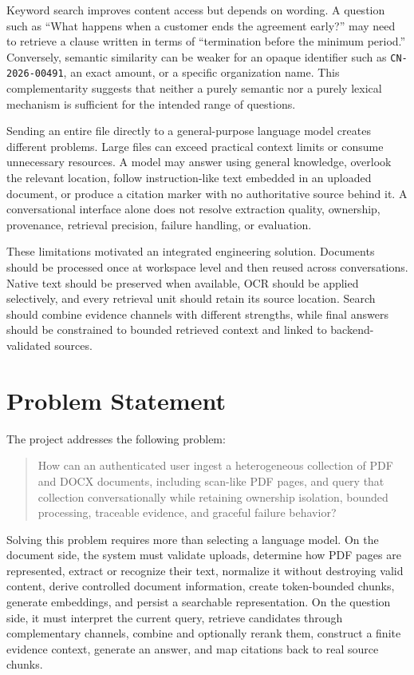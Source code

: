 Keyword search improves content access but depends on wording. A question such as ``What happens when a customer ends the agreement early?'' may need to retrieve a clause written in terms of ``termination before the minimum period.'' Conversely, semantic similarity can be weaker for an opaque identifier such as \texttt{CN-2026-00491}, an exact amount, or a specific organization name. This complementarity suggests that neither a purely semantic nor a purely lexical mechanism is sufficient for the intended range of questions.

Sending an entire file directly to a general-purpose language model creates different problems. Large files can exceed practical context limits or consume unnecessary resources. A model may answer using general knowledge, overlook the relevant location, follow instruction-like text embedded in an uploaded document, or produce a citation marker with no authoritative source behind it. A conversational interface alone does not resolve extraction quality, ownership, provenance, retrieval precision, failure handling, or evaluation.

These limitations motivated an integrated engineering solution. Documents should be processed once at workspace level and then reused across conversations. Native text should be preserved when available, OCR should be applied selectively, and every retrieval unit should retain its source location. Search should combine evidence channels with different strengths, while final answers should be constrained to bounded retrieved context and linked to backend-validated sources.

\section{Problem Statement}
\label{sec:introduction-problem}

The project addresses the following problem:

\begin{quote}
How can an authenticated user ingest a heterogeneous collection of PDF and DOCX documents, including scan-like PDF pages, and query that collection conversationally while retaining ownership isolation, bounded processing, traceable evidence, and graceful failure behavior?
\end{quote}

Solving this problem requires more than selecting a language model. On the document side, the system must validate uploads, determine how PDF pages are represented, extract or recognize their text, normalize it without destroying valid content, derive controlled document information, create token-bounded chunks, generate embeddings, and persist a searchable representation. On the question side, it must interpret the current query, retrieve candidates through complementary channels, combine and optionally rerank them, construct a finite evidence context, generate an answer, and map citations back to real source chunks.

